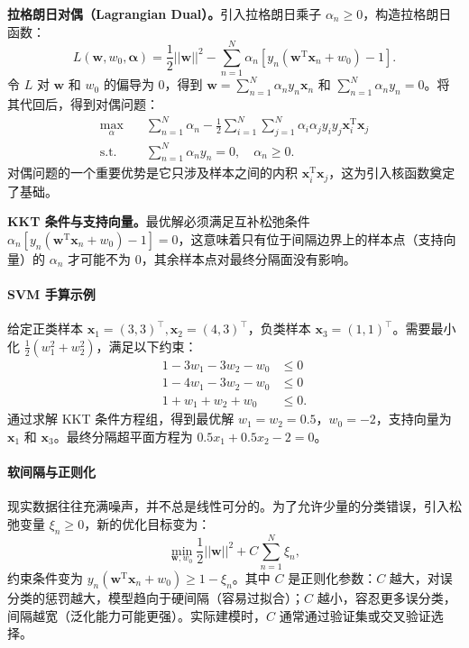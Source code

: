 \textbf{拉格朗日对偶（Lagrangian Dual）。}引入拉格朗日乘子 $\alpha_n \ge 0$，构造拉格朗日函数：
\begin{equation}
    L(\mathbf{w}, w_0, \mathbf{\alpha}) = \frac{1}{2}||\mathbf{w}||^2 - \sum_{n=1}^{N}\alpha_n [y_n(\mathbf{w}^{\textrm{T}}\mathbf{x}_n + w_0) - 1].
\end{equation}
令 $L$ 对 $\mathbf{w}$ 和 $w_0$ 的偏导为 0，得到 $\mathbf{w} = \sum_{n=1}^{N} \alpha_n y_n \mathbf{x}_n$ 和 $\sum_{n=1}^{N} \alpha_n y_n = 0$。将其代回后，得到对偶问题：
\begin{equation}
\begin{aligned}
    \max_{\alpha} \quad & \sum_{n=1}^{N} \alpha_n - \frac{1}{2}\sum_{i=1}^{N}\sum_{j=1}^{N} \alpha_i \alpha_j y_i y_j \mathbf{x}_i^{\textrm{T}}\mathbf{x}_j \\
    \textrm{s.t.} \quad & \sum_{n=1}^{N} \alpha_n y_n = 0, \quad \alpha_n \ge 0.
\end{aligned}
\end{equation}
对偶问题的一个重要优势是它只涉及样本之间的内积 $\mathbf{x}_i^{\textrm{T}}\mathbf{x}_j$，这为引入核函数奠定了基础。

\textbf{KKT 条件与支持向量。}最优解必须满足互补松弛条件 $\alpha_n [y_n(\mathbf{w}^{\textrm{T}}\mathbf{x}_n + w_0) - 1] = 0$，这意味着只有位于间隔边界上的样本点（支持向量）的 $\alpha_n$ 才可能不为 0，其余样本点对最终分隔面没有影响。

\paragraph{SVM 手算示例}

给定正类样本 $\mathbf{x}_1=(3,3)^\top, \mathbf{x}_2=(4,3)^\top$，负类样本 $\mathbf{x}_3=(1,1)^\top$。需要最小化 $\frac{1}{2}(w_1^2 + w_2^2)$，满足以下约束：
\begin{align*}
    1 - 3w_1 - 3w_2 - w_0 &\le 0 \\
    1 - 4w_1 - 3w_2 - w_0 &\le 0 \\
    1 + w_1 + w_2 + w_0 &\le 0.
\end{align*}
通过求解 KKT 条件方程组，得到最优解 $w_1 = w_2 = 0.5$，$w_0 = -2$，支持向量为 $\mathbf{x}_1$ 和 $\mathbf{x}_3$。最终分隔超平面方程为 $0.5 x_1 + 0.5 x_2 - 2 = 0$。

\paragraph{软间隔与正则化}

现实数据往往充满噪声，并不总是线性可分的。为了允许少量的分类错误，引入松弛变量 $\xi_n \ge 0$，新的优化目标变为：
\begin{equation}
    \min_{\mathbf{w}, w_0} \frac{1}{2}||\mathbf{w}||^2 + C \sum_{n=1}^{N} \xi_n,
\end{equation}
约束条件变为 $y_n (\mathbf{w}^{\textrm{T}} \mathbf{x}_n + w_0) \geq 1 - \xi_n$。其中 $C$ 是正则化参数：$C$ 越大，对误分类的惩罚越大，模型趋向于硬间隔（容易过拟合）；$C$ 越小，容忍更多误分类，间隔越宽（泛化能力可能更强）。实际建模时，$C$ 通常通过验证集或交叉验证选择。


